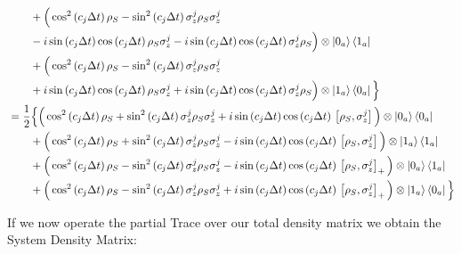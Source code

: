 \documentclass[a4paper,12pt]{article}
\begin{document}
\begin{align*}
	  	& \qquad  + \Big( \cos^{2}{\left( c_j \Delta t \right)} \, \rho_S - \sin^{2}{\left( c_j \Delta t \right)} \, \sigma_{z}^{j}\rho_S\sigma_{z}^{j} \\
	  	& \qquad - i \sin{\left( c_j \Delta t \right)}\cos{\left( c_j \Delta t \right)} \, \rho_S \sigma_{z}^{j} - i \sin{\left( c_j \Delta t \right)}\cos{\left( c_j \Delta t \right)} \, \sigma_{z}^{j} \rho_S \Big) \otimes \ket{0_a}\bra{1_a} \\
	  	& \qquad  + \Big( \cos^{2}{\left( c_j \Delta t \right)} \, \rho_S - \sin^{2}{\left( c_j \Delta t \right)} \, \sigma_{z}^{j}\rho_S\sigma_{z}^{j} \\
	  	& \qquad + i \sin{\left( c_j \Delta t \right)}\cos{\left( c_j \Delta t \right)} \, \rho_S \sigma_{z}^{j} + i \sin{\left( c_j \Delta t \right)}\cos{\left( c_j \Delta t \right)} \, \sigma_{z}^{j} \rho_S \Big) \otimes \ket{1_a}\bra{0_a} \Big\} \\
	  	& = \frac{1}{2} \Big\{ \Big( \cos^{2}{\left( c_j \Delta t \right)} \, \rho_S + \sin^{2}{\left( c_j \Delta t \right)} \, \sigma_{z}^{j}\rho_S\sigma_{z}^{j} 
	  	+i \sin{\left( c_j \Delta t \right)}\cos{\left( c_j \Delta t \right)} \, \left[ \rho_S, \sigma_{z}^{j} \right] \Big) \otimes \ket{0_a}\bra{0_a} \\
	  	& \qquad  + \Big( \cos^{2}{\left( c_j \Delta t \right)} \, \rho_S + \sin^{2}{\left( c_j \Delta t \right)} \, \sigma_{z}^{j}\rho_S\sigma_{z}^{j} 
	  	-i \sin{\left( c_j \Delta t \right)}\cos{\left( c_j \Delta t \right)} \, \left[ \rho_S, \sigma_{z}^{j} \right] \Big) \otimes \ket{1_a}\bra{1_a} \\
	  	& \qquad  + \Big( \cos^{2}{\left( c_j \Delta t \right)} \, \rho_S - \sin^{2}{\left( c_j \Delta t \right)} \, \sigma_{z}^{j}\rho_S\sigma_{z}^{j} 
	  	-i \sin{\left( c_j \Delta t \right)}\cos{\left( c_j \Delta t \right)} \, \left[ \rho_S, \sigma_{z}^{j} \right]_{+} \Big) \otimes \ket{0_a}\bra{1_a} \\
	  	& \qquad  + \Big( \cos^{2}{\left( c_j \Delta t \right)} \, \rho_S - \sin^{2}{\left( c_j \Delta t \right)} \, \sigma_{z}^{j}\rho_S\sigma_{z}^{j} 
	  	+i \sin{\left( c_j \Delta t \right)}\cos{\left( c_j \Delta t \right)} \, \left[ \rho_S, \sigma_{z}^{j} \right]_{+} \Big) \otimes \ket{1_a}\bra{0_a} \Big\}
	  \end{align*}
	  
	  If we now operate the partial Trace over our total density matrix we obtain the System Density Matrix:
	  
\end{document}
